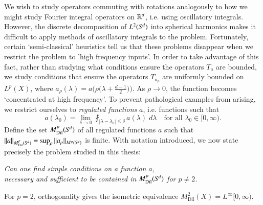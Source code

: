 We wish to study operators commuting with rotations analogously to how we might study Fourier integral operators on $\operatorname{\mathbb{R}}^d$, i.e. using oscillatory integrals. However, the discrete decomposition of $L^2({S}^{\!{d}})$ into spherical harmonics makes it difficult to apply methods of oscillatory integrals to the problem. Fortunately, certain `semi-classical' heuristics tell us that these problems disappear when we restrict the problem to 'high frequency inputs'. In order to take advantage of this fact, rather than studying what conditions ensure the operators $T_a$ are bounded, we study conditions that ensure the operators $T_{a_\rho}$ are uniformly bounded on $L^p(X)$, where $a_\rho(\lambda) = a \big( \rho \big(\lambda + \tfrac{d-1}{2} \big) \big)$. As $\rho \to 0$, the function becomes `concentrated at high frequency'. %
To prevent pathological examples from arising, we restrict ourselves to \emph{regulated functions} $a$, i.e. functions such that
%
%
\begin{equation}
  a(\lambda_0) = \lim_{\delta \to 0} \fint_{|\lambda - \lambda_0| \leq \delta} a(\lambda)\; d\lambda \quad \text{for all $\lambda_0 \in [0,\infty)$}.
\end{equation}
%
%
%
Define the set $M^p_{\text{Dil}}({S}^{\!{d}})$ of all regulated functions $a$ such that $\| a \|_{M^p_{\text{Dil}}({S}^{\!{d}})} = \sup_\rho \| a_\rho \|_{M^p({S}^{\!{d}})}$ is finite. With notation introduced, we now state precisely the problem studied in this thesis:
\begin{changemargin}{2cm}{2cm}
\begin{center}
  \emph{Can one find simple conditions on a function $a$,\\
  necessary and sufficient to be contained in $M^p_{\text{Dil}}({S}^{\!{d}})$ for $p \neq 2$.}
\end{center}
\end{changemargin}
%
For $p = 2$, orthogonality gives the isometric equivalence $M^2_{\text{Dil}}(X) = L^\infty[0,\infty)$.

